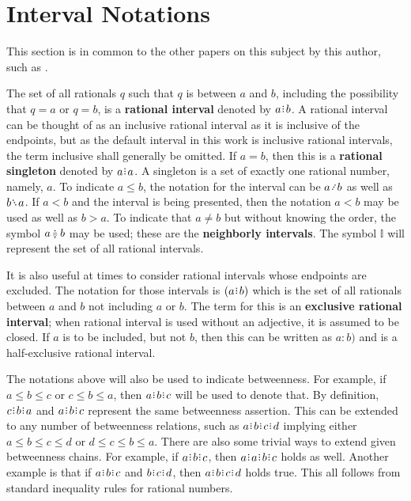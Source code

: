 \documentclass[12pt]{article}
\begin{document}
\section{Interval Notations}

This section is in common to the other papers on this subject by this author, such as \cite{taylor24dedekind}.

The set of all rationals $q$ such that $q$ is between $a$ and $b$, including the possibility that $q=a$ or $q=b$, is a \textbf{rational interval} denoted by $a\rint b$. A rational interval can be thought of as an inclusive rational interval as it is inclusive of the endpoints, but as the default interval in this work is inclusive rational intervals, the term inclusive shall generally be omitted.  If $a=b$, then this is a \textbf{rational singleton} denoted by $a\rint a$. A singleton is a set of exactly one rational number, namely, $a$. To indicate $a \leq b$, the notation for the interval can be $a \lte b$ as well as $b \gte a$. If $a < b$ and the interval is being presented, then the notation $a \lt b$ may be used as well as $b \gt a$. To indicate that $a \neq b$ but without knowing the order, the symbol $a \betneq b$ may be used; these are the \textbf{neighborly intervals}. The symbol $\mathbb{I}$ will represent the set of all rational intervals. 

It is also useful at times to consider rational intervals whose endpoints are excluded. The notation for those intervals is $(a \rint b)$ which is the set of all rationals between $a$ and $b$ not including $a$ or $b$. The term for this is an \textbf{exclusive rational interval}; when rational interval is used without an adjective, it is assumed to be closed. If $a$ is to be included, but not $b$, then this can be written as $a:b)$ and is a half-exclusive rational interval. 

The notations above will also be used to indicate betweenness. For example, if $a \leq b \leq c$ or $c \leq b \leq a$, then $a\rint b\rint c$ will be used to denote that. By definition, $c\rint b\rint a$ and $a\rint b\rint c$ represent the same betweenness assertion. This can be extended to any number of betweenness relations, such as $a\rint b\rint c\rint d$ implying either $a \leq b \leq c \leq d$ or $d \leq c \leq b \leq a$. There are also some trivial ways to extend given betweenness chains. For example, if $a\rint b\rint c$, then $a\rint a\rint b\rint c$ holds as well. Another example is that if $a\rint b\rint c$ and $b\rint c\rint d$, then $a\rint b\rint c\rint d$ holds true. This all follows from standard inequality rules for rational numbers. 
\end{document}
